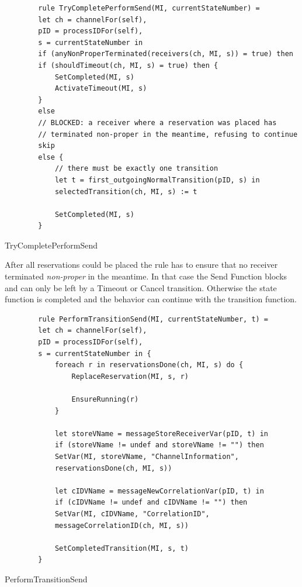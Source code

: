 \begin{listing}[H]
	\begin{verbatim}
		rule TryCompletePerformSend(MI, currentStateNumber) =
		let ch = channelFor(self),
		pID = processIDFor(self),
		s = currentStateNumber in
		if (anyNonProperTerminated(receivers(ch, MI, s)) = true) then
		if (shouldTimeout(ch, MI, s) = true) then {
			SetCompleted(MI, s)
			ActivateTimeout(MI, s)
		}
		else
		// BLOCKED: a receiver where a reservation was placed has
		// terminated non-proper in the meantime, refusing to continue
		skip
		else {
			// there must be exactly one transition
			let t = first_outgoingNormalTransition(pID, s) in
			selectedTransition(ch, MI, s) := t
			
			SetCompleted(MI, s)
		}
	\end{verbatim}
	\caption{TryCompletePerformSend}
	\label{lst:shortasm:TryCompletePerformSend}
\end{listing}


After all reservations could be placed the 
rule has to ensure that no receiver terminated \textit{non-proper} in the
meantime. In that case the Send Function blocks and can only be left by a
Timeout or Cancel transition. Otherwise the state function is completed and the behavior can
continue with the transition function.


\begin{listing}[H]
	\begin{verbatim}
		rule PerformTransitionSend(MI, currentStateNumber, t) =
		let ch = channelFor(self),
		pID = processIDFor(self),
		s = currentStateNumber in {
			foreach r in reservationsDone(ch, MI, s) do {
				ReplaceReservation(MI, s, r)
				
				EnsureRunning(r)
			}
			
			let storeVName = messageStoreReceiverVar(pID, t) in
			if (storeVName != undef and storeVName != "") then
			SetVar(MI, storeVName, "ChannelInformation",
			reservationsDone(ch, MI, s))
			
			let cIDVName = messageNewCorrelationVar(pID, t) in
			if (cIDVName != undef and cIDVName != "") then
			SetVar(MI, cIDVName, "CorrelationID",
			messageCorrelationID(ch, MI, s))
			
			SetCompletedTransition(MI, s, t)
		}
	\end{verbatim}
	\caption{PerformTransitionSend}
	\label{lst:shortasm:PerformTransitionSend}
\end{listing}


